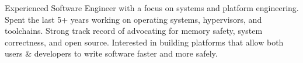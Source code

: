 
\begin{cvparagraph}
  Experienced Software Engineer with a focus on systems and platform engineering. Spent the last 5+ years working on operating systems, hypervisors, and toolchains. Strong track record of advocating for memory safety, system correctness, and open source. Interested in building platforms that allow both users \& developers to write software faster and more safely.
\end{cvparagraph}
